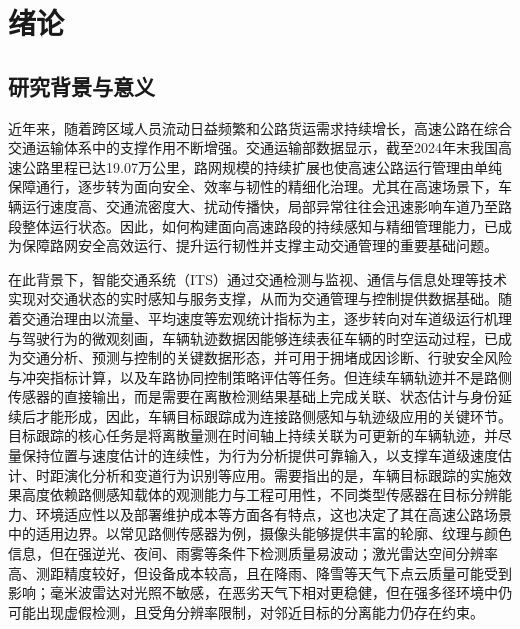 \documentclass{xdupgthesis}
\begin{document}
\chapter{绪论}

\section{研究背景与意义}


近年来，随着跨区域人员流动日益频繁和公路货运需求持续增长，高速公路在综合交通运输体系中的支撑作用不断增强。交通运输部数据显示，截至2024年末我国高速公路里程已达19.07万公里\cite{mot2024statisticalbulletin}，路网规模的持续扩展也使高速公路运行管理由单纯保障通行，逐步转为面向安全、效率与韧性的精细化治理。尤其在高速场景下，车辆运行速度高、交通流密度大、扰动传播快，局部异常往往会迅速影响车道乃至路段整体运行状态。因此，如何构建面向高速路段的持续感知与精细管理能力，已成为保障路网安全高效运行、提升运行韧性并支撑主动交通管理的重要基础问题。

在此背景下，智能交通系统（ITS）通过交通检测与监视、通信与信息处理等技术实现对交通状态的实时感知与服务支撑，从而为交通管理与控制提供数据基础\cite{mimbela2007vdstits}。随着交通治理由以流量、平均速度等宏观统计指标为主，逐步转向对车道级运行机理与驾驶行为的微观刻画，车辆轨迹数据因能够连续表征车辆的时空运动过程，已成为交通分析、预测与控制的关键数据形态\cite{liu2025trajectorysurvey}，并可用于拥堵成因诊断、行驶安全风险与冲突指标计算，以及车路协同控制策略评估等任务。但连续车辆轨迹并不是路侧传感器的直接输出，而是需要在离散检测结果基础上完成关联、状态估计与身份延续后才能形成，因此，车辆目标跟踪成为连接路侧感知与轨迹级应用的关键环节。目标跟踪的核心任务是将离散量测在时间轴上持续关联为可更新的车辆轨迹，并尽量保持位置与速度估计的连续性，为行为分析提供可靠输入，以支撑车道级速度估计、时距演化分析和变道行为识别等应用。需要指出的是，车辆目标跟踪的实施效果高度依赖路侧感知载体的观测能力与工程可用性，不同类型传感器在目标分辨能力、环境适应性以及部署维护成本等方面各有特点，这也决定了其在高速公路场景中的适用边界。以常见路侧传感器为例，摄像头能够提供丰富的轮廓、纹理与颜色信息，但在强逆光、夜间、雨雾等条件下检测质量易波动\cite{Pandharipande2023Perception}；激光雷达空间分辨率高、测距精度较好，但设备成本较高，且在降雨、降雪等天气下点云质量可能受到影响\cite{Pandharipande2023Perception,Wu2025LiDARAdverseWeather}；毫米波雷达对光照不敏感，在恶劣天气下相对更稳健，但在强多径环境中仍可能出现虚假检测，且受角分辨率限制，对邻近目标的分离能力仍存在约束\cite{Kong2025mmWaveSurvey}。
\end{document}
